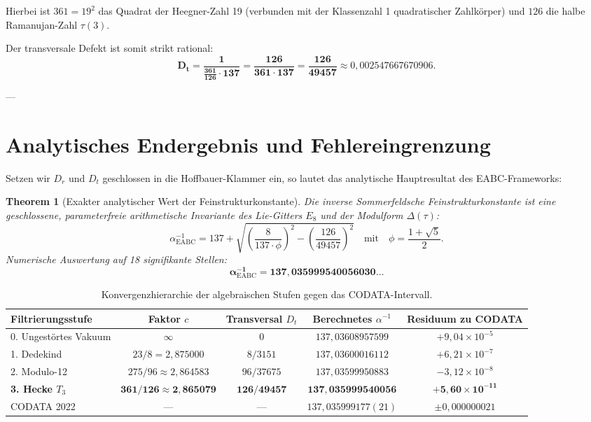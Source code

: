 \documentclass[11pt,a4paper]{article}
\newtheorem{theorem}{Theorem}[section]
\theoremstyle{definition}
\theoremstyle{remark}
\numberwithin{equation}{section}
\begin{document}
Hierbei ist $361 = 19^2$ das Quadrat der Heegner-Zahl 19 (verbunden mit der Klassenzahl 1 quadratischer Zahlkörper) und $126$ die halbe Ramanujan-Zahl $\tau(3)$.

Der transversale Defekt ist somit strikt rational:
\begin{equation}
\mathbf{D_t = \frac{1}{\frac{361}{126} \cdot 137} = \frac{126}{361 \cdot 137} = \frac{126}{49457}} \approx 0{,}002547667670906.
\end{equation}

---

\section{Analytisches Endergebnis und Fehlereingrenzung}

Setzen wir $D_r$ und $D_t$ geschlossen in die Hoffbauer-Klammer ein, so lautet das analytische Hauptresultat des EABC-Frameworks:

\begin{theorem}[Exakter analytischer Wert der Feinstrukturkonstante]
Die inverse Sommerfeldsche Feinstrukturkonstante ist eine geschlossene, parameterfreie arithmetische Invariante des Lie-Gitters $E_8$ und der Modulform $\Delta(\tau)$:
\begin{equation}
\alpha^{-1}_{\mathrm{EABC}} = 137 + \sqrt{\left(\frac{8}{137 \cdot \phi}\right)^2 - \left(\frac{126}{49457}\right)^2} \quad \text{mit} \quad \phi = \frac{1+\sqrt{5}}{2}.
\end{equation}
Numerische Auswertung auf 18 signifikante Stellen:
\begin{equation}
\mathbf{\alpha^{-1}_{\mathrm{EABC}} = 137{,}035999540056030\dots}
\end{equation}
\end{theorem}

\begin{table}[h!]
\centering
\small
\renewcommand{\arraystretch}{1.2}
\begin{tabular}{lcccc}
\toprule
\textbf{Filtrierungsstufe} & \textbf{Faktor $c$} & \textbf{Transversal $D_t$} & \textbf{Berechnetes $\alpha^{-1}$} & \textbf{Residuum zu CODATA} \\
\midrule
0. Ungestörtes Vakuum & $\infty$ & $0$ & $137{,}03608957599$ & $+9{,}04 \times 10^{-5}$ \\
1. Dedekind & $23/8 = 2{,}875000$ & $8/3151$ & $137{,}03600016112$ & $+6{,}21 \times 10^{-7}$ \\
2. Modulo-12 & $275/96 \approx 2{,}864583$ & $96/37675$ & $137{,}03599950883$ & $-3{,}12 \times 10^{-8}$ \\
\textbf{3. Hecke $T_3$} & $\mathbf{361/126 \approx 2{,}865079}$ & $\mathbf{126/49457}$ & $\mathbf{137{,}035999540056}$ & $\mathbf{+5{,}60 \times 10^{-11}}$ \\
\midrule
CODATA 2022 & — & — & $137{,}035999177(21)$ & $\pm 0{,}000000021$ \\
\bottomrule
\end{tabular}
\caption{Konvergenzhierarchie der algebraischen Stufen gegen das CODATA-Intervall.}
\label{tab:hecke_convergence}
\end{table}
\end{document}
